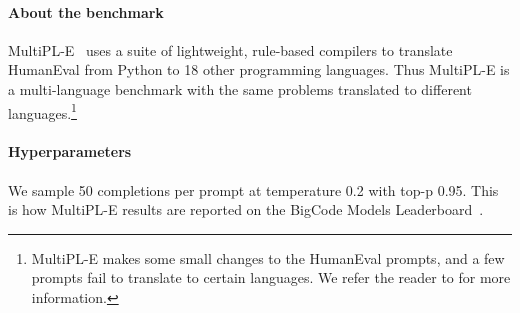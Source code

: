 \documentclass[10pt]{article} %
\begin{document}
\paragraph{About the benchmark} MultiPL-E~\citep{cassano:multipl-e} uses a suite of lightweight, rule-based compilers to translate HumanEval from Python to 18 other programming languages. Thus MultiPL-E is a multi-language benchmark with the same problems translated to different languages.\footnote{MultiPL-E makes some small changes to the HumanEval prompts, and a few prompts fail to translate to certain languages. We refer the reader to \citet{cassano:multipl-e} for more information.}

\paragraph{Hyperparameters} We sample 50 completions per prompt at temperature 0.2 with top-p 0.95. This is how MultiPL-E results are reported on the BigCode Models Leaderboard~\citep{allalBigCodeModels}.


\begin{table}[tb!]
\caption{Pass@1 results on MultiPL-E averaged over 50 samples for each problem. All models are evaluated at temperature $0.2$ and top-p $0.95$.}\label{tab:multipl-e}
\centering
\small

\end{table}
\end{document}
